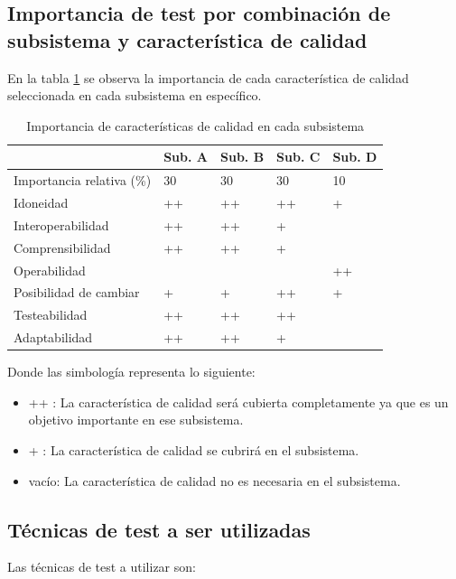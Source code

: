 \documentclass[
11pt, %
codirector, %
]{simple_charter}
\begin{document}
\subsection{Importancia de test por combinación de subsistema y característica de calidad}
\label{ssec:importancia-de-test-por-combinacion-de-subsistema-y-caracteristica-de-calidad}

En la tabla \ref{tab:quality-subsys} se observa la importancia de cada característica de
calidad seleccionada en cada subsistema en específico.

\begin{table}[ht]
\centering
\begin{tabular}{@{}lllll@{}}
\toprule
 & Sub. A & Sub. B & Sub. C & Sub. D \\ \midrule
\rowcolor[HTML]{EFEFEF}
Importancia relativa (\%) & 30 & 30 & 30 & 10 \\
Idoneidad & ++ & ++ & ++ & + \\
Interoperabilidad & ++ & ++ & + &  \\
Comprensibilidad & ++ & ++ & + &  \\
Operabilidad &  &  &  & ++ \\
Posibilidad de cambiar & + & + & ++ & + \\
Testeabilidad & ++ & ++ & ++ &  \\
Adaptabilidad & ++ & ++ & + &  \\ \bottomrule
\end{tabular}
\caption{Importancia de características de calidad en cada subsistema}
\label{tab:quality-subsys}
\end{table}

Donde las simbología representa lo siguiente:
\begin{itemize}
	\item ++ : La característica de calidad será cubierta completamente ya que es un objetivo
	importante en ese subsistema.
	\item + : La característica de calidad se cubrirá en el subsistema.
	\item vacío: La característica de calidad no es necesaria en el subsistema.
\end{itemize}

\subsection{Técnicas de test a ser utilizadas}
\label{ssec:tecnicas-de-test-a-ser-utilizadas}

Las técnicas de test a utilizar son:
\end{document}
